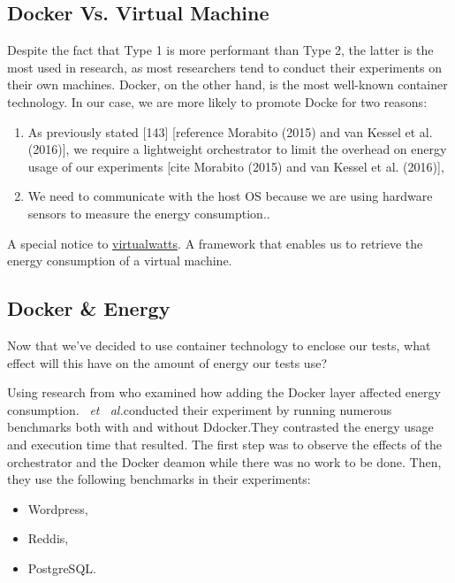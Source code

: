 \subsection{Docker Vs. Virtual Machine}
Despite the fact that Type 1 is more performant than Type 2, the latter is the most used in research, as most researchers tend to conduct their experiments on their own machines. Docker, on the other hand, is the most well-known container technology. In our case, we are more likely to promote Docke for two reasons:
\begin{enumerate}
    \item As previously stated [143] [reference Morabito (2015) and van Kessel et al. (2016)], we require a lightweight orchestrator to limit the overhead on energy usage of our experiments
          \cite{van2016power}
          [cite Morabito (2015) and van Kessel et al. (2016)],
    \item We need to communicate with the host OS because we are using hardware sensors to measure the energy consumption..
\end{enumerate}

A special notice to \href{https://github.com/powerapi-ng/virtualwatts}{virtualwatts}. A framework that enables us to retrieve the energy consumption of a virtual machine.


\subsection{Docker \& Energy}
Now that we've decided to use container technology to enclose our tests, what effect will this have on the amount of energy our tests use?

Using research from \cite{santos2018does} who examined how adding the Docker layer affected energy consumption.
\citeauthor{santos2018does}~\emph{et~ al.}conducted their experiment by running numerous benchmarks both with and without Ddocker.They contrasted the energy usage and execution time that resulted.
The first step was to observe the effects of the orchestrator and the Docker deamon while there was no work to be done.
Then, they use the following benchmarks in their experiments:

\begin{itemize}
    \item Wordpress,
    \item Reddis,
    \item PostgreSQL.
\end{itemize}

